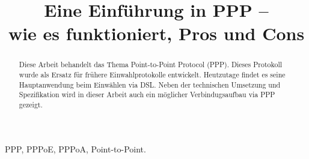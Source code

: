 \documentclass[journal,11pt]{IEEEtran}
\begin{document}
 
\title{Eine Einführung in PPP -- \\wie es funktioniert, Pros und Cons}
\author{
 }
\maketitle 
\begin{abstract} 
Diese Arbeit behandelt das Thema Point-to-Point Protocol (PPP). Dieses Protokoll wurde als Ersatz f\"ur fr\"uhere Einwahlprotokolle entwickelt. Heutzutage findet es seine Hauptanwendung beim Einw\"ahlen via DSL. Neben der technischen Umsetzung und Spezifikation wird in dieser Arbeit auch ein m\"oglicher Verbindugsaufbau via PPP gezeigt.
\end{abstract} 
\begin{IEEEkeywords} 
PPP, PPPoE, PPPoA, Point-to-Point.
\end{IEEEkeywords}
\end{document}
